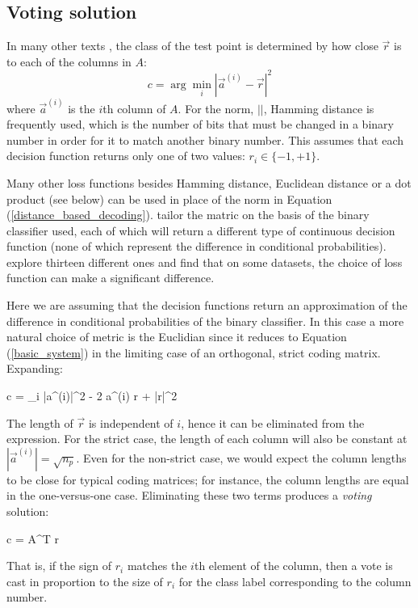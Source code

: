\subsection{Voting solution}

In many other texts \citep{Allwein_etal2000,Hsu_Lin2002,Dietterich_Bakiri1995},
the class of the test point is determined by how close $\vec r$
is to each of the columns in $A$:
\begin{equation}
	c = \arg \min_i |\vec a^{(i)} - \vec r|^2
	\label{distance_based_decoding}
\end{equation}
where $\vec a^{(i)}$ is the $i$th column of $A$.
For the norm, $||$, Hamming distance is
frequently used, which is the number of bits that must be changed
in a binary number in order for it to match another binary number.
This assumes that each decision function returns only one of two values: 
$r_i \in \lbrace -1, +1 \rbrace$.

Many other loss functions besides Hamming distance,
Euclidean distance or a dot product (see below) can be used in place of the 
norm in Equation (\ref{distance_based_decoding}).
\citet{Allwein_etal2000} 
tailor the matric on the basis of the binary classifier used, each of which
will return a different type of continuous decision function 
(none of which represent the difference in conditional probabilities).
\citet{Escalera_etal2010} explore thirteen different ones and find that on
some datasets, the choice of loss function can make a significant difference.

Here we are assuming that the decision functions return an approximation of the 
difference in conditional probabilities of the binary classifier.
In this case a more natural choice of metric is the Euclidian
since it reduces to Equation (\ref{basic_system}) in the limiting
case of an orthogonal, strict coding matrix. Expanding:
\begin{eqnnon}
	c = \arg \min_i \left \lbrace |\vec a^{(i)}|^2 - 2 \vec a^{(i)} \cdot \vec r + |\vec r|^2 \right \rbrace
\end{eqnnon}
The length of $\vec r$ is independent of $i$, hence it can be eliminated from the expression.
For the strict case, the length of each column will also be constant at $|\vec a^{(i)}|=\sqrt{n_p}$.
Even for the non-strict case, we would expect the column lengths to be close for typical coding 
matrices; for instance, the column lengths are equal in the one-versus-one case.
Eliminating these two terms produces a {\it voting} solution:
\begin{eqnnon}
	c = \arg \max A^T \vec r
\end{eqnnon}
That is, if the sign of $r_i$ matches the $i$th element of the column, then a vote is cast 
in proportion to the size of $r_i$ for the class label corresponding to the column number.

